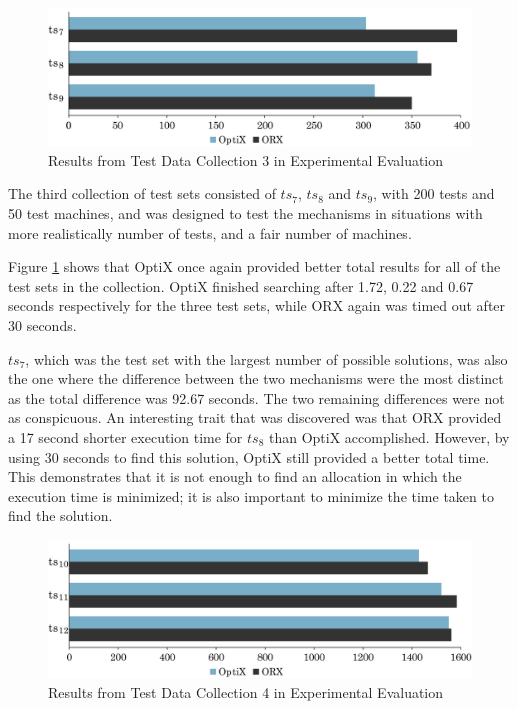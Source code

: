 \begin{figure}[b]
    \centering
    \includegraphics[width=\textwidth]{figures/test_results/3.pdf}
    \caption{Results from Test Data Collection 3 in Experimental Evaluation}
    \label{3rd_test_set}
\end{figure}

The third collection of test sets consisted of $ts_7$, $ts_8$ and $ts_9$, with 200 tests and 50 test machines, and was designed to test the mechanisms in situations with more realistically number of tests, and a fair number of machines.

Figure \ref{3rd_test_set} shows that OptiX once again provided better total results for all of the test sets in the collection. OptiX finished searching after 1.72, 0.22 and 0.67 seconds respectively for the three test sets, while ORX again was timed out after 30 seconds.

$ts_7$, which was the test set with the largest number of possible solutions, was also the one where the difference between the two mechanisms were the most distinct as the total difference was 92.67 seconds. The two remaining differences were not as conspicuous. An interesting trait that was discovered was that ORX provided a 17 second shorter execution time for $ts_8$ than OptiX accomplished. However, by using 30 seconds to find this solution, OptiX still provided a better total time. This demonstrates that it is not enough to find an allocation in which the execution time is minimized; it is also important to minimize the time taken to find the solution. 

\begin{figure}[t]
    \centering
    \includegraphics[width=\textwidth]{figures/test_results/4.pdf}
    \caption{Results from Test Data Collection 4 in Experimental Evaluation}
    \label{4th_test_set}
\end{figure}

